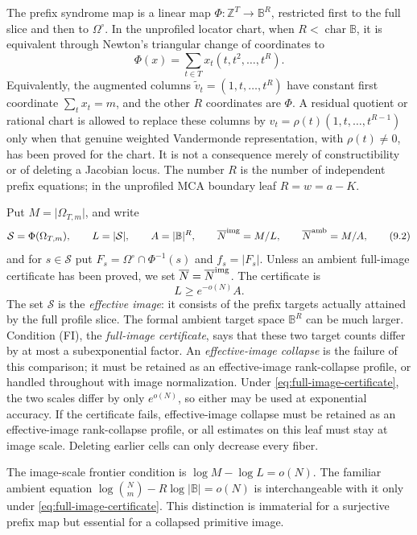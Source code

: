 \documentclass[12pt,a4paper]{amsart}
\numberwithin{equation}{section}
\theoremstyle{remark}
\newcommand{\B}{\mathbb B}
\newcommand{\Z}{\mathbb Z}
\newcommand{\Omc}{\Omega^{\circ}}
\newcommand{\Scal}{\mathcal S}
\newcommand{\barN}{\overline N}
\newcommand{\abs}[1]{\lvert #1\rvert}
\begin{document}
The prefix syndrome map is a linear map \(\Phi:\Z^T\to\B^R\), restricted
first to the full slice and then to \(\Omc\).  In the unprofiled locator
chart, when \(R<\operatorname{char}\B\), it is equivalent through Newton's
triangular change of coordinates to
\[
        \Phi(x)=\sum_{t\in T}x_t(t,t^2,\ldots,t^R).
        \tag{9.1}\label{eq:exact-power-sum-map}
\]
Equivalently, the augmented columns
\(\widetilde v_t=(1,t,\ldots,t^R)\) have constant first coordinate
\(\sum_tx_t=m\), and the other \(R\) coordinates are \(\Phi\).  A residual
quotient or rational chart is allowed to replace these columns by
\(v_t=\rho(t)(1,t,\ldots,t^{R-1})\) only when that genuine weighted
Vandermonde representation, with \(\rho(t)\ne0\), has been proved for the
chart.  It is not a consequence merely of constructibility or of deleting
a Jacobian locus.  The number \(R\) is the number of independent prefix
equations; in the unprofiled MCA boundary leaf \(R=w=a-K\).

Put \(M=\abs{\Omega_{T,m}}\), and write
\[
 \Scal=\Phi(\Omega_{T,m}),\qquad L=\abs\Scal,
 \qquad A=\abs\B^R,
 \qquad \barN^{\rm img}=M/L,
 \qquad \barN^{\rm amb}=M/A,
 \tag{9.2}\label{eq:image-ambient-scales}
\]
and for \(s\in\Scal\) put
\(F_s=\Omc\cap\Phi^{-1}(s)\) and \(f_s=\abs{F_s}\).  Unless an
ambient full-image certificate has been proved, we set
\(\barN=\barN^{\rm img}\).  The certificate is
\[
        L\ge e^{-o(N)}A.                       \tag{FI}\label{eq:full-image-certificate}
\]
The set \(\Scal\) is the \emph{effective image}: it consists of the
prefix targets actually attained by the full profile slice.  The formal
ambient target space \(\B^R\) can be much larger.  Condition \textup{(FI)},
the \emph{full-image certificate}, says that these two target counts differ
by at most a subexponential factor.  An \emph{effective-image collapse} is
the failure of this comparison; it must be retained as an effective-image
rank-collapse profile, or handled throughout with image normalization.
Under \eqref{eq:full-image-certificate}, the two scales differ by only
\(e^{o(N)}\), so either may be used at exponential accuracy.  If the
certificate fails, effective-image collapse must be retained as an
effective-image rank-collapse profile, or all estimates on this leaf must stay
at image scale.  Deleting earlier cells can only decrease every fiber.

The image-scale frontier condition is
\(\log M-\log L=o(N)\).  The familiar ambient equation
\(\log\binom Nm-R\log\abs\B=o(N)\) is interchangeable with it only under
\eqref{eq:full-image-certificate}.  This distinction is immaterial for a
surjective prefix map but essential for a collapsed primitive image.
\end{document}
